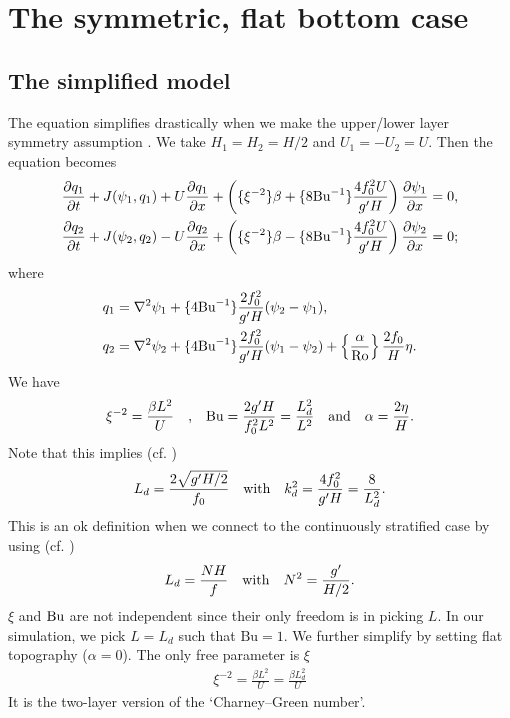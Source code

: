 \section{The symmetric, flat bottom case}
\subsection{The simplified model}
The equation simplifies drastically when we make the upper/lower layer symmetry assumption \parencite{LarichevHeld_95}. We take $H_1=H_2 = H/2$ and $U_1=-U_2=U$. Then the equation becomes
\begin{align}
    &\frac{\partial q_1}{\partial t}+J(\psi_1,q_1)+U\frac{\partial q_1}{\partial x}+\left(\{\xi^{-2}\}\beta+\{8\text{Bu}^{-1}\}\frac{4f_0^2U}{g'H}\right)\frac{\partial\psi_1}{\partial x} = 0,\label{eq:2lay_sym_eq1}\\
    &\frac{\partial q_2}{\partial t}+J(\psi_2,q_2)-U\frac{\partial q_2}{\partial x}+\left(\{\xi^{-2}\}\beta-\{8\text{Bu}^{-1}\}\frac{4f_0^2U}{g'H}\right)\frac{\partial\psi_2}{\partial x} = 0;\label{eq:2lay_sym_eq2}
\end{align}
where
\begin{align}
    q_1 &= \nabla^2\psi_1 + \{4\text{Bu}^{-1}\}\frac{2f_0^2}{g'H}(\psi_2-\psi_1),\label{eq:2lay_sym_pv1}\\
    q_2 &= \nabla^2\psi_2 + \{4\text{Bu}^{-1}\}\frac{2f_0^2}{g'H}(\psi_1-\psi_2)+\left\{\frac{\alpha}{\text{Ro}}\right\}\frac{2f_0}{H}\eta.\label{eq:2lay_sym_pv2}
\end{align}
We have 
\begin{align}
    \xi^{-2} = \frac{\beta L^2}{U} \quad \mbox{,} \quad \text{Bu} = \frac{2g'H}{f_0^2L^2} = \frac{L_{d}^2}{L^2} \quad \mbox{and} \quad \alpha = \frac{2\eta}{H}.
\end{align}
Note that this implies (cf. \cite[(9.103)]{Vallis_17})
\begin{align}
    L_d = \frac{2\sqrt{g'H/2}}{f_0} \quad \mbox{with} \quad k_d^2 = \frac{4f_0^2}{g'H} = \frac{8}{L_d^2}.
\end{align}
This is an ok definition when we connect to the continuously stratified case by using (cf. \cite[(5.138)]{Vallis_17})
\begin{align}
    L_d = \frac{NH}{f} \quad \mbox{with} \quad N^2 = \frac{g'}{H/2}.
\end{align}
$\xi$ and $\text{Bu}$ are not independent since their only freedom is in picking $L$. In our simulation, we pick $L=L_d$ such that $\text{Bu}=1$. 
We further simplify by setting flat topography ($\alpha=0$). The only free parameter is $\xi$
\begin{align}
    \xi^{-2}= \frac{\beta L^2}{U} = \frac{\beta L_d^2}{U}
\end{align}
It is the two-layer version of the `Charney–Green number’. 

